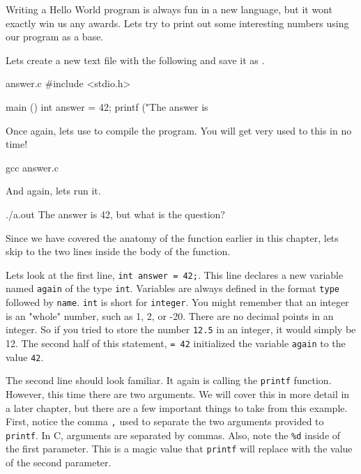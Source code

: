 Writing a Hello World program is always fun in a new language, but it wont
exactly win us any awards. Lets try to print out some interesting numbers
using our program as a base.

Lets create a new text file with the following and save it as .

\begin{code}{answer.c}
#include <stdio.h>

main ()
{
    int answer = 42;
    printf ("The answer is %
}
\end{code}

Once again, lets use  to compile the program. You will get very
used to this in no time!

\begin{Terminal}
gcc answer.c
\end{Terminal}

And again, lets run it.

\begin{Terminal}
./a.out
The answer is 42, but what is the question?
\end{Terminal}

Since we have covered the anatomy of the  function earlier in this
chapter, lets skip to the two lines inside the body of the function.

Lets look at the first line, \verb|int answer = 42;|. This line declares a new
variable named \verb|again| of the type \verb|int|. Variables are always
defined in the format \verb|type| followed by \verb|name|. \verb|int| is short
for \verb|integer|.  You might remember that an integer is an "whole" number,
such as 1, 2, or -20.  There are no decimal points in an integer. So if you
tried to store the number \verb|12.5| in an integer, it would simply be 12. The
second half of this statement, \verb|= 42| initialized the variable
\verb|again| to the value \verb|42|.

The second line should look familiar. It again is calling the \verb|printf|
function. However, this time there are two arguments. We will cover this in
more detail in a later chapter, but there are a few important things to take
from this example. First, notice the comma \verb|,| used to separate the
two arguments provided to \verb|printf|. In C, arguments are separated by
commas. Also, note the \verb|%d| inside of the first parameter. This is a
magic value that \verb|printf| will replace with the value of the second
parameter.


